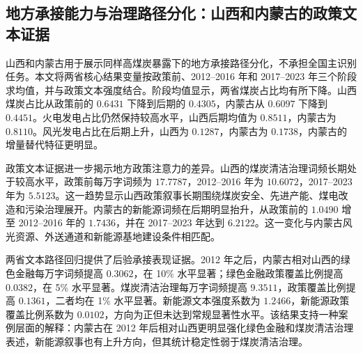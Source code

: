 \documentclass[UTF8,12pt]{ctexart}
\begin{document}
\subsection{地方承接能力与治理路径分化：山西和内蒙古的政策文本证据}

山西和内蒙古用于展示同样高煤炭暴露下的地方承接路径分化，不承担全国主识别任务。本文将两省核心结果变量按政策前、2012--2016 年和 2017--2023 年三个阶段求均值，并与政策文本强度结合。阶段均值显示，两省煤炭占比均有所下降。山西煤炭占比从政策前的 $0.6431$ 下降到后期的 $0.4305$，内蒙古从 $0.6097$ 下降到 $0.4451$。火电发电占比仍然保持较高水平，山西后期均值为 $0.8511$，内蒙古为 $0.8110$。风光发电占比在后期上升，山西为 $0.1287$，内蒙古为 $0.1738$，内蒙古的增量替代特征更明显。

政策文本证据进一步揭示地方政策注意力的差异。山西的煤炭清洁治理词频长期处于较高水平，政策前每万字词频为 $17.7787$，2012--2016 年为 $10.6072$，2017--2023 年为 $5.5123$。这一趋势显示山西政策叙事长期围绕煤炭安全、先进产能、煤电改造和污染治理展开。内蒙古的新能源词频在后期明显抬升，从政策前的 $1.0490$ 增至 2012--2016 年的 $1.7436$，并在 2017--2023 年达到 $6.2122$。这一变化与内蒙古风光资源、外送通道和新能源基地建设条件相匹配。

两省文本路径回归提供了后验承接表现证据。2012 年之后，内蒙古相对山西的绿色金融每万字词频提高 $0.3062$，在 10\% 水平显著；绿色金融政策覆盖比例提高 $0.0382$，在 5\% 水平显著。煤炭清洁治理每万字词频提高 $9.3511$，政策覆盖比例提高 $0.1361$，二者均在 1\% 水平显著。新能源文本强度系数为 $1.2466$，新能源政策覆盖比例系数为 $0.0102$，方向为正但未达到常规显著性水平。该结果支持一种案例层面的解释：内蒙古在 2012 年后相对山西更明显强化绿色金融和煤炭清洁治理表述，新能源叙事也有上升方向，但其统计稳定性弱于煤炭清洁治理。
\end{document}
